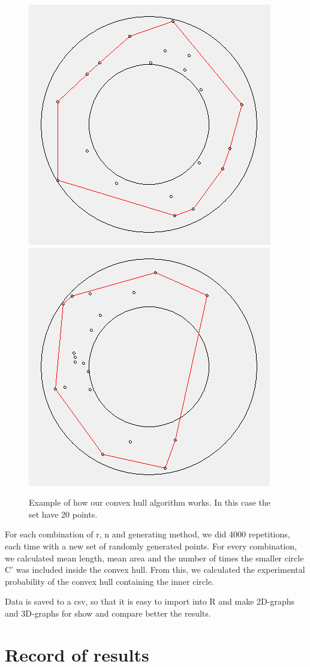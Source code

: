 \documentclass[12pt,a4paper]{article}
\begin{document}
\begin{figure}[H]
 \centering
  {
   \label{f:graph1}
    \includegraphics[width=0.3 \textwidth]{convex_hull1.png}} \hspace{25mm}
  {
   \label{f:graph2}
    \includegraphics[width=0.3  \textwidth]{convex_hull2.png}}
 \caption{Example of how our convex hull algorithm works. In this case the set have 20 points.}
 \label{f:graphs}
\end{figure}

For each combination of r, n and generating method, we did 4000 repetitions, each time with a new set of randomly generated points. For every combination, we calculated mean length, mean area and the number of times the smaller circle C’ was included inside the convex hull. From this, we calculated the experimental probability of the convex hull containing the inner circle. \medskip
 
Data is saved to a csv, so that it is easy to import into R and make 2D-graphs and 3D-graphs for show and compare better the results.

\section*{Record of results}
\end{document}
